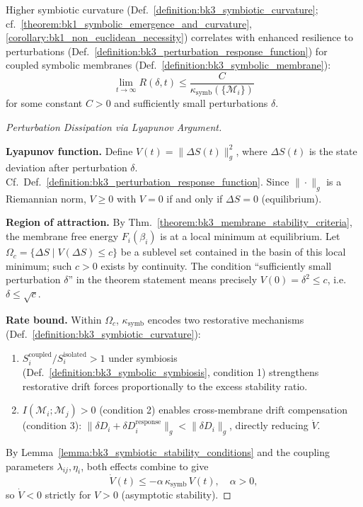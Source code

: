 \begin{theorem} \label{theorem:bk3_symbiotic_curvature_and_resilience}
Higher symbiotic curvature (Def.~\ref{definition:bk3_symbiotic_curvature}; cf.~\ref{theorem:bk1_symbolic_emergence_and_curvature}, \ref{corollary:bk1_non_euclidean_necessity}) correlates with enhanced resilience to perturbations (Def.~\ref{definition:bk3_perturbation_response_function}) for coupled symbolic membranes (Def.~\ref{definition:bk3_symbolic_membrane}):
\[
\lim_{t \rightarrow \infty} R(\delta, t) \leq \frac{C}{\kappa_{\text{symb}}(\{\mathcal{M}_i\})}
\]
for some constant $C > 0$ and sufficiently small perturbations $\delta$.
\end{theorem}

\begin{proof}[Perturbation Dissipation via Lyapunov Argument]
\label{proof:bk3_sketch_perturbation_dissiptation}
\leavevmode

\textbf{Lyapunov function.}
Define $V(t) = \|\Delta S(t)\|_g^2$, where $\Delta S(t)$ is the state
deviation after perturbation $\delta$.
Cf.~Def.~\ref{definition:bk3_perturbation_response_function}.
Since $\|\cdot\|_g$ is a Riemannian norm, $V \geq 0$ with $V = 0$ if and only if $\Delta S = 0$ (equilibrium).

\textbf{Region of attraction.}
By Thm.~\ref{theorem:bk3_membrane_stability_criteria}, the membrane free energy
$F_i(\beta_i)$ is at a local minimum at equilibrium.
Let $\Omega_c = \{\Delta S \mid V(\Delta S) \leq c\}$ be a sublevel set contained
in the basin of this local minimum; such $c > 0$ exists by continuity.
The condition ``sufficiently small perturbation $\delta$'' in the theorem
statement means precisely $V(0) = \delta^2 \leq c$, i.e.\ $\delta \leq \sqrt{c}$.

\textbf{Rate bound.}
Within $\Omega_c$, $\kappa_{\text{symb}}$ encodes two restorative mechanisms
(Def.~\ref{definition:bk3_symbiotic_curvature}):
\begin{enumerate}
    \item $S_i^{\text{coupled}}/S_i^{\text{isolated}} > 1$ under symbiosis
    (Def.~\ref{definition:bk3_symbolic_symbiosis}, condition 1) strengthens
    restorative drift forces proportionally to the excess stability ratio.
    \item $I(\mathcal{M}_i;\mathcal{M}_j) > 0$ (condition 2) enables cross-membrane
    drift compensation (condition 3):
    $\|\delta D_i + \delta D_i^{\text{response}}\|_g < \|\delta D_i\|_g$,
    directly reducing $\dot{V}$.
\end{enumerate}
By Lemma~\ref{lemma:bk3_symbiotic_stability_conditions} and the coupling
parameters $\lambda_{ij}, \eta_i$, both effects combine to give
\[
    \dot{V}(t) \leq -\alpha\,\kappa_{\text{symb}}\,V(t), \quad \alpha > 0,
\]
so $\dot{V} < 0$ strictly for $V > 0$ (asymptotic stability).


\end{proof}

